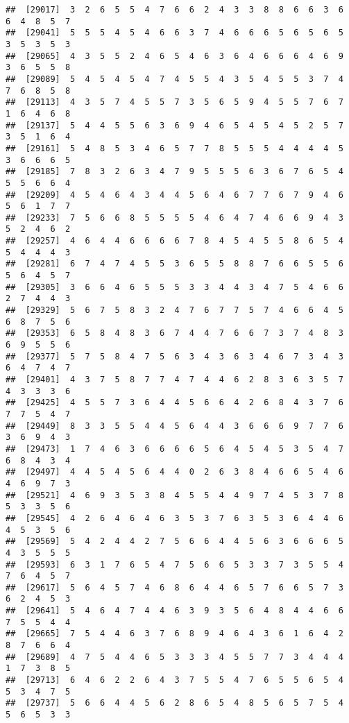 \documentclass[
]{book}
\begin{document}
\begin{verbatim}
##  [29017]  3  2  6  5  5  4  7  6  6  2  4  3  3  8  8  6  6  3  6  6  4  8  5  7
##  [29041]  5  5  5  4  5  4  6  6  3  7  4  6  6  6  5  6  5  6  5  3  5  3  5  3
##  [29065]  4  3  5  5  2  4  6  5  4  6  3  6  4  6  6  6  4  6  9  3  6  5  5  8
##  [29089]  5  4  5  4  5  4  7  4  5  5  4  3  5  4  5  5  3  7  4  7  6  8  5  8
##  [29113]  4  3  5  7  4  5  5  7  3  5  6  5  9  4  5  5  7  6  7  1  6  4  6  8
##  [29137]  5  4  4  5  5  6  3  6  9  4  6  5  4  5  4  5  2  5  7  3  5  1  6  4
##  [29161]  5  4  8  5  3  4  6  5  7  7  8  5  5  5  4  4  4  4  5  3  6  6  6  5
##  [29185]  7  8  3  2  6  3  4  7  9  5  5  5  6  3  6  7  6  5  4  5  5  6  6  4
##  [29209]  4  5  4  6  4  3  4  4  5  6  4  6  7  7  6  7  9  4  6  5  6  1  7  7
##  [29233]  7  5  6  6  8  5  5  5  5  4  6  4  7  4  6  6  9  4  3  5  2  4  6  2
##  [29257]  4  6  4  4  6  6  6  6  7  8  4  5  4  5  5  8  6  5  4  5  4  4  4  3
##  [29281]  6  7  4  7  4  5  5  3  6  5  5  8  8  7  6  6  5  5  6  5  6  4  5  7
##  [29305]  3  6  6  4  6  5  5  5  3  3  4  4  3  4  7  5  4  6  6  2  7  4  4  3
##  [29329]  5  6  7  5  8  3  2  4  7  6  7  7  5  7  4  6  6  4  5  6  8  7  5  6
##  [29353]  6  5  8  4  8  3  6  7  4  4  7  6  6  7  3  7  4  8  3  6  9  5  5  6
##  [29377]  5  7  5  8  4  7  5  6  3  4  3  6  3  4  6  7  3  4  3  6  4  7  4  7
##  [29401]  4  3  7  5  8  7  7  4  7  4  4  6  2  8  3  6  3  5  7  4  3  3  3  6
##  [29425]  4  5  5  7  3  6  4  4  5  6  6  4  2  6  8  4  3  7  6  7  7  5  4  7
##  [29449]  8  3  3  5  5  4  4  5  6  4  4  3  6  6  6  9  7  7  6  3  6  9  4  3
##  [29473]  1  7  4  6  3  6  6  6  6  5  6  4  5  4  5  3  5  4  7  6  8  4  3  4
##  [29497]  4  4  5  4  5  6  4  4  0  2  6  3  8  4  6  6  5  4  6  4  6  9  7  3
##  [29521]  4  6  9  3  5  3  8  4  5  5  4  4  9  7  4  5  3  7  8  5  3  3  5  6
##  [29545]  4  2  6  4  6  4  6  3  5  3  7  6  3  5  3  6  4  4  6  4  5  3  5  6
##  [29569]  5  4  2  4  4  2  7  5  6  6  4  4  5  6  3  6  6  6  5  4  3  5  5  5
##  [29593]  6  3  1  7  6  5  4  7  5  6  6  5  3  3  7  3  5  5  4  7  6  4  5  7
##  [29617]  5  6  4  5  7  4  6  8  6  4  4  6  5  7  6  6  5  7  3  6  2  4  5  3
##  [29641]  5  4  6  4  7  4  4  6  3  9  3  5  6  4  8  4  4  6  6  7  5  5  4  4
##  [29665]  7  5  4  4  6  3  7  6  8  9  4  6  4  3  6  1  6  4  2  8  7  6  6  4
##  [29689]  4  7  5  4  4  6  5  3  3  3  4  5  5  7  7  3  4  4  4  1  7  3  8  5
##  [29713]  6  4  6  2  2  6  4  3  7  5  5  4  7  6  5  5  6  5  4  5  3  4  7  5
##  [29737]  5  6  6  4  4  5  6  2  8  6  5  4  8  5  6  5  7  5  4  5  6  5  3  3

\end{verbatim}
\end{document}
